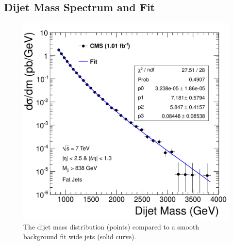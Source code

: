 \clearpage

\subsection{Dijet Mass Spectrum and Fit}

\begin{figure}[!ht]
  \begin{center}
   \includegraphics[width=\textwidth]{Figures/DijetMass_withFit_fat.pdf}
    \caption{The dijet mass distribution (points) compared to a smooth background fit wide jets (solid
curve). }
    \label{Fit_wide}
  \end{center}
\end{figure}


